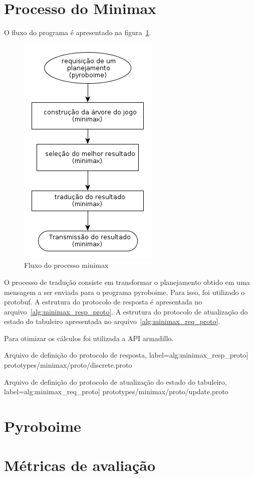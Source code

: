 \section{Processo do Minimax}\label{sec:minimax}

O fluxo do programa é apresentado na figura~\ref{fig:minimax_flow}.

\begin{figure}
  \centering
  \includegraphics[width=0.2 \linewidth]{img/minimax_flow}
  \caption{Fluxo do processo minimax}\label{fig:minimax_flow}
\end{figure}

O processo de tradução consiste em transformar o planejamento obtido em uma
mensagem a ser enviada para o programa pyroboime. Para isso, foi utilizado
o protobuf. A estrutura do protocolo de resposta é apresentada no
arquivo~\ref{alg:minimax_resp_proto}. A estrutura do protocolo de atualização do
estado do tabuleiro apresentada no arquivo~\ref{alg:minimax_req_proto}.

Para otimizar os cálculos foi utilizada a API armadillo.

{Arquivo de definição do protocolo de resposta},
label={alg:minimax_resp_proto}] {prototypes/minimax/proto/discrete.proto}

{Arquivo de definição do protocolo de atualização do
  estado do tabuleiro},
label={alg:minimax_req_proto}] {prototypes/minimax/proto/update.proto}

\section{Pyroboime}\label{sec:pyroboime}
\section{Métricas de avaliação}\label{sec:metricas}
